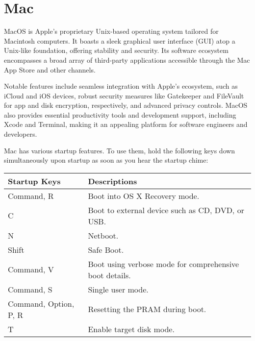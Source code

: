 \chapter{Mac}
\thispagestyle{fancy}
\lstset{}\lstset{language=Bash, style=shellstyle}

MacOS is Apple's proprietary Unix-based operating system tailored for Macintosh computers. It boasts a sleek graphical user interface (GUI) atop a Unix-like foundation, offering stability and security. Its software ecosystem encompasses a broad array of third-party applications accessible through the Mac App Store and other channels.

Notable features include seamless integration with Apple's ecosystem, such as iCloud and iOS devices, robust security measures like Gatekeeper and FileVault for app and disk encryption, respectively, and advanced privacy controls. MacOS also provides essential productivity tools and development support, including Xcode and Terminal, making it an appealing platform for software engineers and developers.


\begin{fancybox}{}	
	Mac has various startup features. To use them, hold the following keys down simultaneously upon startup as soon as you hear the startup chime:
	\begin{center}
		\begin{tabular}{l|l}
			Startup Keys & Descriptions \\
			\hline
			Command, R & Boot into OS X Recovery mode. \\
			C & Boot to external device such as CD, DVD, or USB. \\
			N & Netboot. \\
			Shift & Safe Boot. \\
			Command, V & Boot using verbose mode for comprehensive boot details. \\
			Command, S & Single user mode. \\
			Command, Option, P, R & Resetting the PRAM during boot. \\
			T & Enable target disk mode.
		\end{tabular}
	\end{center}
\end{fancybox}



